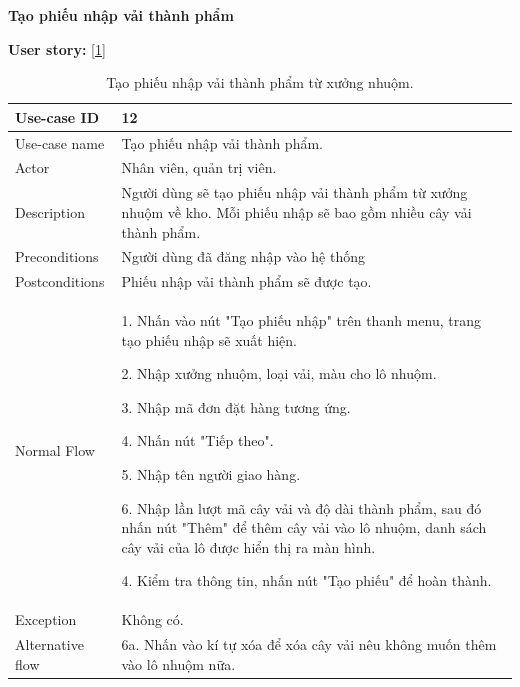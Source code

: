 \newpage
\textbf{Tạo phiếu nhập vải thành phẩm}\par
\textbf{User story:}  [\ref{bang11}]
\begin{table}[!htp]
    \centering
    \begin{tabular}{|m{3cm}|m{10cm}|}
    \hline 
        Use-case ID & 12\\ \hline
        Use-case name & Tạo phiếu nhập vải thành phẩm.\\ \hline
        Actor & Nhân viên, quản trị viên.\\ \hline
        Description & Người dùng sẽ tạo phiếu nhập vải thành phẩm từ xưởng nhuộm về kho. Mỗi phiếu nhập sẽ bao gồm nhiều cây vải thành phẩm.\\ \hline
        Preconditions & Người dùng đã đăng nhập vào hệ thống \\ \hline
        Postconditions & Phiếu nhập vải thành phẩm sẽ được tạo.\\ \hline
        Normal Flow & 
        1. Nhấn vào nút "Tạo phiếu nhập" trên thanh menu, trang tạo phiếu nhập sẽ xuất hiện.\par
        2. Nhập xưởng nhuộm, loại vải, màu cho lô nhuộm.\par
        3. Nhập mã đơn đặt hàng tương ứng.\par
        4. Nhấn nút "Tiếp theo".\par
        5. Nhập tên người giao hàng.\par
        6.  Nhập lần lượt mã cây vải và độ dài thành phẩm, sau đó nhấn nút "Thêm" để thêm cây vải vào lô nhuộm, danh sách cây vải của lô được hiển thị ra màn hình.\par
        4. Kiểm tra thông tin, nhấn nút "Tạo phiếu" để hoàn thành.
        \\ \hline
        Exception & Không có.
        \\ \hline
        Alternative flow & 
        6a. Nhấn vào kí tự xóa để xóa cây vải nêu không muốn thêm vào lô nhuộm nữa.
        \\ 
    \hline 
    \end{tabular}
    \caption{Tạo phiếu nhập vải thành phẩm từ xưởng nhuộm.}
    \label{bang11}
\end{table}

